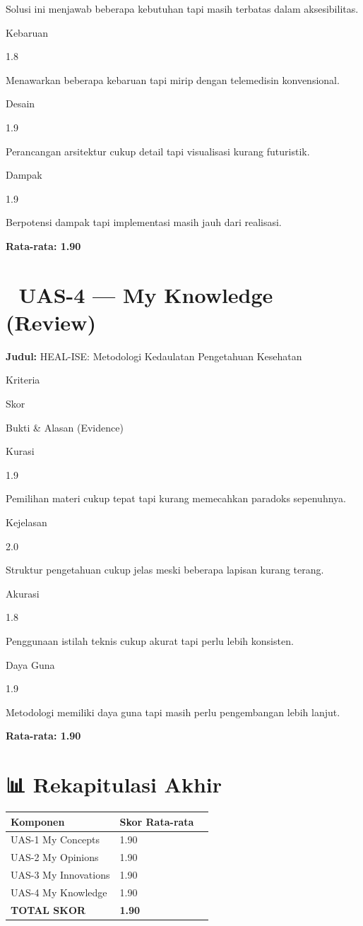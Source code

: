 \documentclass[
  letterpaper,
  DIV=11,
  numbers=noendperiod]{scrreprt}
\begin{document}
Solusi ini menjawab beberapa kebutuhan tapi masih terbatas dalam
aksesibilitas.

Kebaruan

1.8

Menawarkan beberapa kebaruan tapi mirip dengan telemedisin konvensional.

Desain

1.9

Perancangan arsitektur cukup detail tapi visualisasi kurang futuristik.

Dampak

1.9

Berpotensi dampak tapi implementasi masih jauh dari realisasi.

\textbf{Rata-rata: 1.90}

\section{🧠 UAS-4 --- My Knowledge
(Review)}\label{uas-4-my-knowledge-review}

\textbf{Judul:} HEAL-ISE: Metodologi Kedaulatan Pengetahuan Kesehatan

Kriteria

Skor

Bukti \& Alasan (Evidence)

Kurasi

1.9

Pemilihan materi cukup tepat tapi kurang memecahkan paradoks sepenuhnya.

Kejelasan

2.0

Struktur pengetahuan cukup jelas meski beberapa lapisan kurang terang.

Akurasi

1.8

Penggunaan istilah teknis cukup akurat tapi perlu lebih konsisten.

Daya Guna

1.9

Metodologi memiliki daya guna tapi masih perlu pengembangan lebih
lanjut.

\textbf{Rata-rata: 1.90}

\section{📊 Rekapitulasi Akhir}\label{rekapitulasi-akhir}

\begin{longtable}[]{@{}lll@{}}
\toprule\noalign{}
\textbf{Komponen} & \textbf{Skor Rata-rata} & \\
\midrule\noalign{}
\endhead
\bottomrule\noalign{}
\endlastfoot
UAS-1 My Concepts & 1.90 & \\
UAS-2 My Opinions & 1.90 & \\
UAS-3 My Innovations & 1.90 & \\
UAS-4 My Knowledge & 1.90 & \\
\textbf{TOTAL SKOR} & \textbf{1.90} & \\
\end{longtable}
\end{document}
